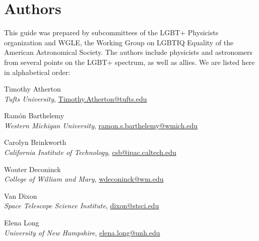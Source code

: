 %

\chapter{Authors}	%
\label{authors}		%
\normalsize			%

This guide was prepared by subcommittees of the LGBT+ Physicists organization and WGLE, the Working Group on LGBTIQ Equality of the American Astronomical Society. The authors include physicists and astronomers from several points on the LGBT+ spectrum, as well as allies. We are listed here in alphabetical order:


\vspace*{\baselineskip}

\noindent Timothy Atherton\\
\indent \emph{Tufts University}, \href{mailto:Timothy.Atherton@tufts.edu}{Timothy.Atherton@tufts.edu}\vspace*{\baselineskip}

\noindent Ram\'{o}n Barthelemy\\
\indent \emph{Western Michigan University}, \href{mailto:ramon.s.barthelemy@wmich.edu}{ramon.s.barthelemy@wmich.edu}\vspace*{\baselineskip}

\noindent Carolyn Brinkworth\\
\indent \emph{California Institute of Technology}, \href{mailto:csb@ipac.caltech.edu}{csb@ipac.caltech.edu}\vspace*{\baselineskip}

\noindent Wouter Deconinck\\
\indent \emph{College of William and Mary}, \href{mailto:wdeconinck@wm.edu}{wdeconinck@wm.edu}\vspace*{\baselineskip}

\noindent Van Dixon\\
\indent \emph{Space Telescope Science Institute}, \href{mailto:dixon@stsci.edu}{dixon@stsci.edu}\vspace*{\baselineskip}

\noindent Elena Long\\
\indent \emph{University of New Hampshire}, \href{mailto:elena.long@unh.edu}{elena.long@unh.edu}\vspace*{\baselineskip}

